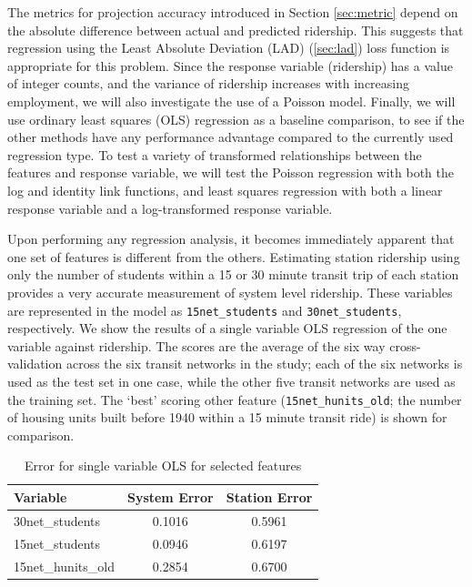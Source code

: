 \documentclass[11pt]{article}
\begin{document}
The metrics for projection accuracy introduced in Section \ref{sec:metric} depend on the absolute difference between actual and predicted ridership. This suggests that regression using the Least Absolute Deviation (LAD) (\ref{sec:lad}) loss function is appropriate for this problem. Since the response variable (ridership) has a value of integer counts, and the variance of ridership increases with increasing employment, we will also investigate the use of a Poisson model. Finally, we will use ordinary least squares (OLS) regression as a baseline comparison, to see if the other methods have any performance advantage compared to the currently used regression type. To test a variety of transformed relationships between the features and response variable, we will test the Poisson regression with both the log and identity link functions, and least squares regression with both a linear response variable and a log-transformed response variable.

Upon performing any regression analysis, it becomes immediately apparent that one set of features is different from the others. Estimating station ridership using only the number of students within a 15 or 30 minute transit trip of each station provides a very accurate measurement of system level ridership. These variables are represented in the model as \texttt{15net\_students} and \texttt{30net\_students}, respectively. We show the results of a single variable OLS regression of the one variable against ridership. The scores are the average of the six way cross-validation across the six transit networks in the study; each of the six networks is used as the test set in one case, while the other five transit networks are used as the training set. The `best' scoring other feature (\texttt{15net\_hunits\_old}; the number of housing units built before 1940 within a 15 minute transit ride) is shown for comparison.

\begin{table}[H]
\centering
\begin{tabular}{lcc}
\toprule Variable&System Error&Station Error\\
\midrule 30net\_students&0.1016&0.5961\\
15net\_students&0.0946&0.6197\\
15net\_hunits\_old&0.2854&0.6700\\ 
\end{tabular}
\caption{Error for single variable OLS for selected features}\label{tab:students}
\end{table}
\end{document}
